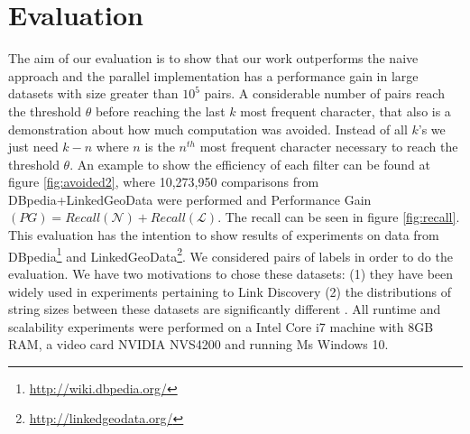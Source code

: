 \section{Evaluation} \label{evaluation}

The aim of our evaluation is to show that our work outperforms the naive approach and the parallel implementation has a performance gain in large datasets with size greater than $10^5$ pairs.
A considerable number of pairs reach the threshold $\theta$ before reaching the last $k$ most frequent character, that also is a demonstration about how much computation was avoided. 
Instead of all $k$'s we just need $k-n$ where $n$ is the $n^{th}$ most frequent character necessary to reach the threshold $\theta$. 
An example to show the efficiency of each filter can be found at  figure \ref{fig:avoided2}, where 10,273,950 comparisons from DBpedia+LinkedGeoData were performed and Performance Gain $(PG)=Recall(\mathcal{N}) + Recall(\mathcal{L})$. 
The recall can be seen in figure \ref{fig:recall}.
This evaluation has the intention to show results of experiments on data from DBpedia\footnote{\url{http://wiki.dbpedia.org/}} and LinkedGeoData\footnote{\url{http://linkedgeodata.org/}}. We considered pairs of labels in order to do the evaluation.
We have two motivations to chose these datasets: (1) they have been widely used in experiments pertaining to Link Discovery (2) the distributions of string sizes between these datasets are significantly different \cite{dressler2014efficient}. 
All runtime and scalability experiments were performed on a Intel Core i7 machine with 8GB RAM, a video card NVIDIA NVS4200 and running Ms Windows 10.


